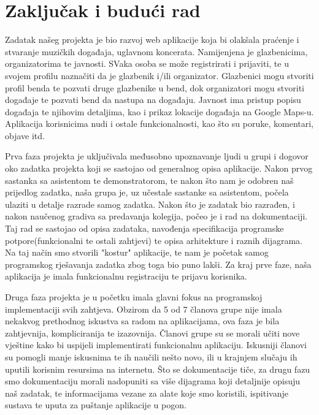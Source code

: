 \label{key}\chapter{Zaključak i budući rad}
		
		
		
	
		 
		 Zadatak našeg projekta je bio razvoj web aplikacije koja bi olakšala praćenje i stvaranje muzičkih događaja, uglavnom koncerata. Namijenjena je glazbenicima, organizatorima te javnosti. SVaka osoba se može registrirati i prijaviti, te u svojem profilu naznačiti da je glazbenik i/ili organizator. Glazbenici mogu stvoriti profil benda te pozvati druge glazbenike u bend, dok organizatori mogu stvoriti događaje te pozvati bend da nastupa na događaju. Javnost ima pristup popisu događaja te njihovim detaljima, kao i prikaz lokacije događaja na Google Maps-u. Aplikacija korisnicima nudi i ostale funkcionalnosti, kao što su poruke, komentari, objave itd.
		 
		 Prva faza projekta je uključivala međusobno upoznavanje ljudi u grupi i dogovor oko zadatka projekta koji se sastojao od generalnog opisa aplikacije. Nakon prvog sastanka sa asistentom te demonstratorom, te nakon što nam je odobren naš prijedlog zadatka, naša grupa je, uz učestale sastanke sa asistentom, počela ulaziti u detalje razrade samog zadatka. Nakon što je zadatak bio razrađen, i nakon naučenog gradiva sa predavanja kolegija, počeo je i rad na dokumentaciji. Taj rad se sastojao od opisa zadataka, navođenja specifikacija programske potpore(funkcionalni te ostali zahtjevi) te opisa arhitekture i raznih dijagrama. Na taj način smo stvorili "kostur" aplikacije, te nam je početak samog programskog rješavanja zadatka zbog toga bio puno lakši. Za kraj prve faze, naša aplikacija je imala funkcionalnu registraciju te prijavu korisnika.
		 
		 Druga faza projekta je u početku imala glavni fokus na programskoj implementaciji svih zahtjeva. Obzirom da 5 od 7 članova grupe nije imala nekakvog prethodnog iskustva sa radom na aplikacijama, ova faza je bila zahtjevnija, kompliciranija te izazovnija. Članovi grupe su se morali učiti nove vještine kako bi uspijeli implementirati funkcionalnu aplikaciju. Iskusniji članovi su pomogli manje iskusnima te ih naučili nešto novo, ili u krajnjem slučaju ih uputili korisnim resursima na internetu. Što se dokumentacije tiče, za drugu fazu smo dokumentaciju morali nadopuniti sa više dijagrama koji detaljnije opisuju naš zadatak, te informacijama vezane za alate koje smo koristili, ispitivanje sustava te uputa za puštanje aplikacije u pogon.
		 
